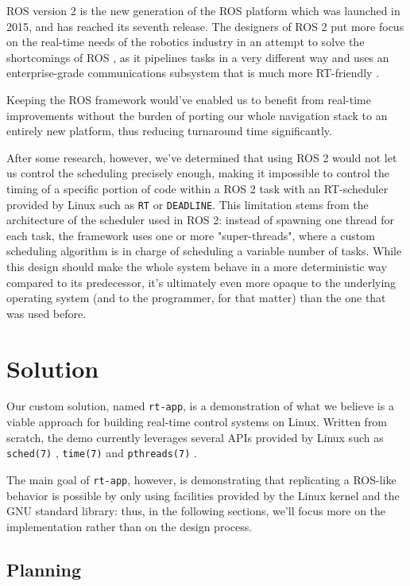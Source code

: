 \documentclass[a4paper,12pt]{report}
\begin{document}
ROS version 2 is the new generation of the ROS platform which was launched in 2015, and has reached its seventh release. The designers of ROS 2 put more focus on the real-time needs of the robotics industry in an attempt to solve the shortcomings of ROS \cite{ros2-realtime-intro}, as it pipelines tasks in a very different way and uses an enterprise-grade communications subsystem that is much more RT-friendly .

Keeping the ROS framework would've enabled us to benefit from real-time improvements without the burden of porting our whole navigation stack to an entirely new platform, thus reducing turnaround time significantly.

After some research, however, we've determined that using ROS 2 would not let us control the scheduling precisely enough, making it impossible to control the timing of a specific portion of code within a ROS 2 task with an RT-scheduler provided by Linux such as \texttt{RT} or \texttt{DEADLINE}. This limitation stems from the architecture of the scheduler used in ROS 2: instead of spawning one thread for each task, the framework uses one or more "super-threads", where a custom scheduling algorithm is in charge of scheduling a variable number of tasks. While this design should make the whole system behave in a more deterministic way compared to its predecessor, it's ultimately even more opaque to the underlying operating system (and to the programmer, for that matter) than the one that was used before.

\newpage
\chapter{Solution}

Our custom solution, named \texttt{rt-app}, is a demonstration of what we believe is a viable approach for building real-time control systems on Linux. Written from scratch, the demo currently leverages several APIs provided by Linux such as \texttt{sched(7)} \cite{man-sched-7}, \texttt{time(7)} \cite{man-time-7} and \texttt{pthreads(7)} \cite{man-pthreads-7}.

The main goal of \texttt{rt-app}, however, is demonstrating that replicating a ROS-like behavior is possible by only using facilities provided by the Linux kernel and the GNU standard library: thus, in the following sections, we'll focus more on the implementation rather than on the design process.

\section{Planning}
\end{document}
